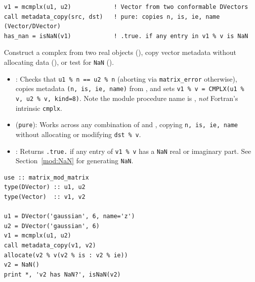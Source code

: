 \lstset{language=[95]Fortran}
\begin{lstlisting}
v1 = mcmplx(u1, u2)            ! Vector from two conformable DVectors
call metadata_copy(src, dst)   ! pure: copies n, is, ie, name (Vector/DVector)
has_nan = isNaN(v1)            ! .true. if any entry in v1 % v is NaN
\end{lstlisting}

Construct a complex  from two real  objects (), copy vector metadata without allocating data (), or test for \texttt{NaN} ().

\begin{itemize}
  \item {}: Checks that \texttt{u1 \% n == u2 \% n} (aborting via \texttt{matrix\_error} otherwise), copies metadata \texttt{(n, is, ie, name)} from , and sets \texttt{v1 \% v = CMPLX(u1 \% v, u2 \% v, kind=8)}. Note the module procedure name is , \emph{not} Fortran's intrinsic \texttt{cmplx}.
  \item {} (\texttt{pure}): Works across any combination of  and , copying \texttt{n, is, ie, name} without allocating or modifying \texttt{dst \% v}.
  \item {}: Returns \texttt{.true.} if any entry of \texttt{v1 \% v} has a \texttt{NaN} real or imaginary part. See Section~\ref{mod:NaN} for generating \texttt{NaN}.
\end{itemize}

\begin{description}[leftmargin=2.2cm, style=nextline]
\end{description}

\lstset{language=[95]Fortran}
\begin{lstlisting}
use :: matrix_mod_matrix
type(DVector) :: u1, u2
type(Vector)  :: v1, v2

u1 = DVector('gaussian', 6, name='z')
u2 = DVector('gaussian', 6)
v1 = mcmplx(u1, u2)
call metadata_copy(v1, v2)
allocate(v2 % v(v2 % is : v2 % ie))
v2 = NaN()
print *, 'v2 has NaN?', isNaN(v2)
\end{lstlisting}
